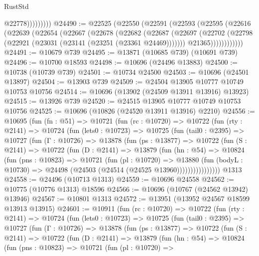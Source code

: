 \begin{lexlean}{RustStd}
\begin{coremodule}
                      @22778)))))))))
@24490 := @22525
    (@22550
      (@22591
        (@22593
          (@22595
            (@22616
              (@22639
                (@22654
                  (@22667
                    (@22678
                      (@22682
                        (@22687
                          (@22697
                            (@22702 (@22798 (@22921 (@23031 (@23141 (@23251 (@23361 @24469)))))))
                            @21365))))))))))))
@24491 := @10679 @739
@24495 := @13871 (@10685 @739) (@10691 @739)
@24496 := @10700 @18593
@24498 := @10696 (@24496 @13883)
@24500 := @10738 (@10739 @739)
@24501 := @10734 @24500
@24503 := @10696 (@24501 @13897)
@24504 := @13903 @739
@24509 := @24504 @13905 @10777 @10749 @10753 @10756
@24514 := @10696 (@13902 (@24509 @13911 @13916) @13923)
@24515 := @13926 @739
@24520 := @24515 @13905 @10777 @10749 @10753 @10756
@24525 := @10696 (@10826 (@24520 @13911 @13916) @2210)
@24556 := @10695
    (fun (fn : @51) =>
    @10721
      (fun (rc : @10720) =>
      @10722
        (fun (rty : @2141) =>
        @10724
          (fun (lets0 : @10723) =>
          @10725
            (fun (tail0 : @2395) =>
            @10727
              (fun (Γ : @10726) =>
              @13878
                (fun (ps : @13877) =>
                @10722
                  (fun (S : @2141) =>
                  @10722
                    (fun (D : @2141) =>
                    @13879
                      (fun (hn : @54) =>
                      @10824
                        (fun (pns : @10823) =>
                        @10721
                          (fun (pl : @10720) =>
                          @13880
                            (fun (bodyL : @10730) =>
                            @24498 (@24503 (@24514 (@24525 @13960))))))))))))))))
    @1313
@24558 := @24496 (@10713 @1313)
@24559 := @10696 @24558
@24562 := @10775 (@10776 @1313) @18596
@24566 := @10696 (@10767 (@24562 @13942) @13946)
@24567 := @10801 @1313
@24572 := @13951 (@13952 @24567 @18599 @13913 @13915)
@24601 := @10911
    (fun (rc : @10720) =>
    @10722
      (fun (rty : @2141) =>
      @10724
        (fun (lets0 : @10723) =>
        @10725
          (fun (tail0 : @2395) =>
          @10727
            (fun (Γ : @10726) =>
            @13878
              (fun (ps : @13877) =>
              @10722
                (fun (S : @2141) =>
                @10722
                  (fun (D : @2141) =>
                  @13879
                    (fun (hn : @54) =>
                    @10824
                      (fun (pns : @10823) =>
                      @10721
                        (fun (pl : @10720) =>

\end{coremodule}
\end{lexlean}
